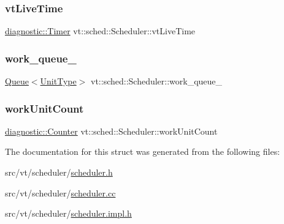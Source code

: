 \subsubsection{\texorpdfstring{vt\+Live\+Time}{vtLiveTime}}
{\footnotesize\ttfamily \hyperlink{namespacevt_1_1diagnostic_a84795feb3d3500ee2d7d59248499efb8}{diagnostic\+::\+Timer} vt\+::sched\+::\+Scheduler\+::vt\+Live\+Time\hspace{0.3cm}{\ttfamily [private]}}

\mbox{\label{structvt_1_1sched_1_1_scheduler_a8176bae441897c36b86e3fb917496a7a}} 
\subsubsection{\texorpdfstring{work\+\_\+queue\+\_\+}{work\_queue\_}}
{\footnotesize\ttfamily \hyperlink{structvt_1_1sched_1_1_queue}{Queue}$<$\hyperlink{structvt_1_1sched_1_1_scheduler_a398229f29b0940cea85aba4bae78b0be}{Unit\+Type}$>$ vt\+::sched\+::\+Scheduler\+::work\+\_\+queue\+\_\+\hspace{0.3cm}{\ttfamily [private]}}

\mbox{\label{structvt_1_1sched_1_1_scheduler_a1b22d8a8efd0cb27fdba01ae616e060b}} 
\subsubsection{\texorpdfstring{work\+Unit\+Count}{workUnitCount}}
{\footnotesize\ttfamily \hyperlink{namespacevt_1_1diagnostic_a55fcc9d6ffa285d1b085c01df2507d2f}{diagnostic\+::\+Counter} vt\+::sched\+::\+Scheduler\+::work\+Unit\+Count\hspace{0.3cm}{\ttfamily [private]}}



The documentation for this struct was generated from the following files\+:\begin{DoxyCompactItemize}
\item 
src/vt/scheduler/\hyperlink{scheduler_8h}{scheduler.\+h}\item 
src/vt/scheduler/\hyperlink{scheduler_8cc}{scheduler.\+cc}\item 
src/vt/scheduler/\hyperlink{scheduler_8impl_8h}{scheduler.\+impl.\+h}\end{DoxyCompactItemize}

